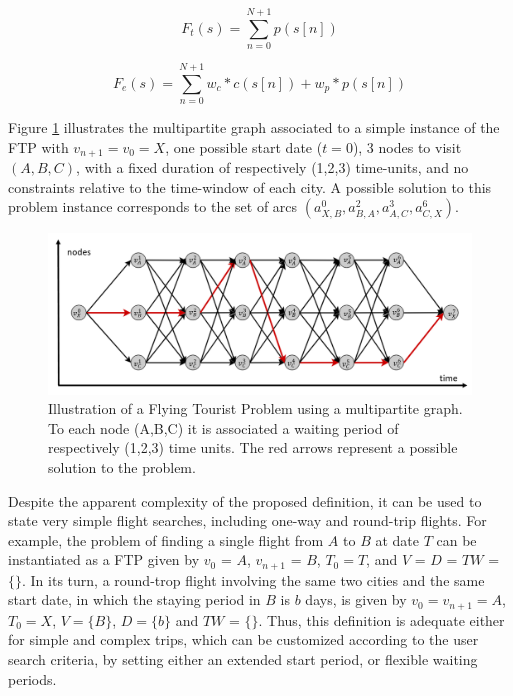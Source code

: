 \begin{equation}
\label{eq:obj_time}
  F_{t}(s) = \sum_{n=0}^{N+1} p(s[n])
\end{equation}

\begin{equation}
\label{eq:obj_entropy}
  F_{e}(s) = \sum_{n=0}^{N+1} w_c*c(s[n]) + w_p*p(s[n])
\end{equation}

Figure \ref{fig:multipartite_sol} illustrates the multipartite graph associated
to a simple instance of the FTP with $v_{n+1} = v_0 = X$, one possible start
date ($t = 0$), 3 nodes to visit $(A, B, C)$, with a fixed duration of
respectively (1,2,3) time-units, and no constraints relative to the time-window
of each city. A possible solution to this problem instance corresponds to the
set of arcs $(a_{X,B}^{0}, a_{B,A}^{2}, a_{A,C}^{3}, a_{C,X}^{6})$.

\begin{figure}[tbp]
  \centering
  \includegraphics[width=1.0\columnwidth]{./imgs/multipartite_axis.png}
  \caption{Illustration of a Flying Tourist Problem using a multipartite graph. To each node (A,B,C) it is associated a waiting period of respectively (1,2,3) time units. The red arrows represent a possible solution to the problem.}
  \label{fig:multipartite_sol}  
\end{figure}


Despite the apparent complexity of the proposed definition, it can be used to
state very simple flight searches, including one-way and round-trip flights. For
example, the problem of finding a single flight from $A$ to $B$ at date $T$ can
be instantiated as a FTP given by $v_0$ = $A$, $v_{n+1}$ = $B$, $T_{0} = T$, and
$V$ = $D$ = $TW$ = $\{\}$. In its turn, a round-trop flight involving the same
two cities and the same start date, in which the staying period in $B$ is $b$
days, is given by $v_0 = v_{n+1} = A$, $T_{0} = X$, $V = \{B\}$, $D = \{b\}$ and
$TW$ = $\{\}$. Thus, this definition is adequate either for simple and complex
trips, which can be customized according to the user search criteria, by setting
either an extended start period, or flexible waiting periods.

